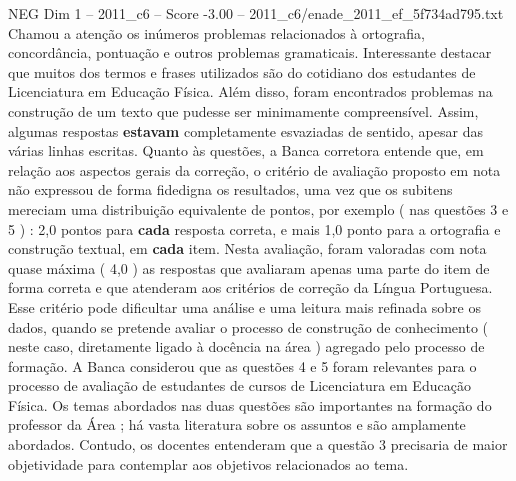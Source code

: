 \begin{textsample}{NEG Dim 1 – 2011\_c6 – Score -3.00 – 2011\_c6/enade\_2011\_ef\_5f734ad795.txt}
Chamou a atenção os inúmeros problemas relacionados à ortografia, concordância, pontuação e outros problemas gramaticais.
Interessante destacar que muitos dos termos e frases utilizados são do cotidiano dos estudantes de Licenciatura em Educação Física.
Além disso, foram encontrados problemas na construção de um texto que pudesse ser minimamente compreensível.
Assim, algumas respostas \textbf{estavam} completamente esvaziadas de sentido, apesar das várias linhas escritas.
Quanto às questões, a Banca corretora entende que, em relação aos aspectos gerais da correção, o critério de avaliação proposto em nota não expressou de forma fidedigna os resultados, uma vez que os subitens mereciam uma distribuição equivalente de pontos, por exemplo ( nas questões 3 e 5 ) : 2,0 pontos para \textbf{cada} resposta correta, e mais 1,0 ponto para a ortografia e construção textual, em \textbf{cada} item.
Nesta avaliação, foram valoradas com nota quase máxima ( 4,0 ) as respostas que avaliaram apenas uma parte do item de forma correta e que atenderam aos critérios de correção da Língua Portuguesa.
Esse critério pode dificultar uma análise e uma leitura mais refinada sobre os dados, quando se pretende avaliar o processo de construção de conhecimento ( neste caso, diretamente ligado à docência na área ) agregado pelo processo de formação.
A Banca considerou que as questões 4 e 5 foram relevantes para o processo de avaliação de estudantes de cursos de Licenciatura em Educação Física.
Os temas abordados nas duas questões são importantes na formação do professor da Área ; há vasta literatura sobre os assuntos e são amplamente abordados.
Contudo, os docentes entenderam que a questão 3 precisaria de maior objetividade para contemplar aos objetivos relacionados ao tema.

\end{textsample}
